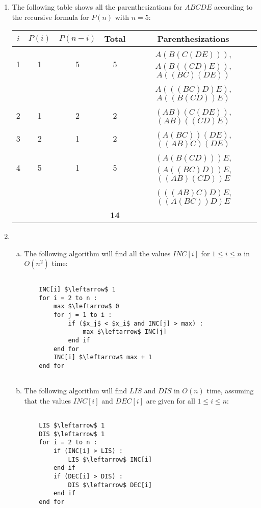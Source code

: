 \documentclass{article}
\begin{document}
\begin{enumerate}[1.]
    \item The following table shows all the parenthesizations for $ABCDE$ according to the recursive formula for $P(n)$ with $n = 5$:
	\begin{table}[ht]
		\centering
		\begin{tabular}{ccccc}
			\toprule
			$i$ & $P(i)$ & $P(n - i)$ & Total & Parenthesizations \\
			\midrule
			1 & 1 & 5 & 5 &  $A(B(C(DE)))$, $A(B((CD)E))$, $A((BC)(DE))$ \\
			  &   &   &   &  $A(((BC)D)E)$, $A((B(CD))E)$\\
			2 & 1 & 2 & 2 &  $(AB)(C(DE))$, $(AB)((CD)E)$\\
			3 & 2 & 1 & 2 &  $(A(BC))(DE)$, $((AB)C)(DE)$\\
			4 & 5 & 1 & 5 &  $(A(B(CD)))E$, $(A((BC)D))E$, $((AB)(CD))E$ \\
			  &   &   &   &  $(((AB)C)D)E$, $((A(BC))D)E$\\
			\midrule
			& & & \textbf{14} & \\
			\bottomrule
		\end{tabular}
	\end{table}

\lstset{showlines=true}

	\item 
	\begin{enumerate}[(a)]
	    \item The following algorithm will find all the values $INC[i]$ for $1 \leq i \leq n$ in $O(n^2)$ time:
\begin{lstlisting}

    INC[i] $\leftarrow$ 1
    for i = 2 to n :
        max $\leftarrow$ 0
        for j = 1 to i :
            if ($x_j$ < $x_i$ and INC[j] > max) :
                max $\leftarrow$ INC[j]
            end if
        end for
        INC[i] $\leftarrow$ max + 1
    end for
    
\end{lstlisting}

        \item The following algorithm will find $LIS$ and $DIS$ in $O(n)$ time, assuming that the values $INC[i]$ and $DEC[i]$ are given for all $1 \leq i \leq n$:
\begin{lstlisting}

    LIS $\leftarrow$ 1
    DIS $\leftarrow$ 1
    for i = 2 to n :
        if (INC[i] > LIS) :
            LIS $\leftarrow$ INC[i]
        end if
        if (DEC[i] > DIS) :
            DIS $\leftarrow$ DEC[i]
        end if
    end for
    

\end{lstlisting}
\end{enumerate}
\end{enumerate}
\end{document}
